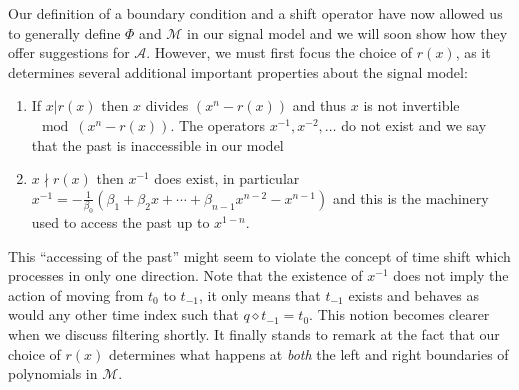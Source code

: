 \documentclass[12pt,technote]{IEEEtran}
\begin{document}
Our definition of a boundary condition and a shift operator have now allowed us to generally define $\Phi$ and $\mathcal{M}$ in our signal model and we will soon show how they offer suggestions for $\mathcal{A}$. However, we must first focus the choice of $r(x)$, as it determines several additional important properties about the signal model:
\begin{enumerate}
    \item If $x|r(x)$ then $x$ divides $(x^n - r(x))$ and thus $x$ is not invertible $\mod{(x^n - r(x))}$. The operators $x^{-1}, x^{-2}, \dots$ do not exist and we say that the past is inaccessible in our model
    \item $x\nmid r(x)$ then $x^{-1}$ does exist, in particular $x^{-1} = -\frac{1}{\beta_0}(\beta_1 + \beta_2x + \cdots +\beta_{n-1}x^{n-2} - x^{n-1})$ and this is the machinery used to access the past up to $x^{1-n}$.
\end{enumerate}
This ``accessing of the past'' might seem to violate the concept of time shift which processes in only one direction. Note that the existence of $x^{-1}$ does not imply the action of moving from $t_0$ to $t_{-1}$, it only means that $t_{-1}$ exists and behaves as would any other time index such that $q\diamond t_{-1} = t_0$. This notion becomes clearer when we discuss filtering shortly. It finally stands to remark at the fact that our choice of $r(x)$ determines what happens at \textit{both} the left and right boundaries of polynomials in $\mathcal{M}$.
\end{document}
